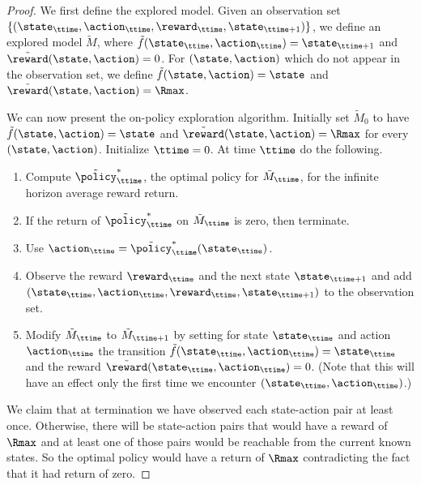 \begin{proof}
We first define the explored model. Given an observation set
$\{(\state_\ttime,\action_\ttime ,\reward_\ttime,
\state_{\ttime+1})\}$, we define an explored model $\tilde{M}$,
where $\tilde{f}(\state_\ttime,\action_\ttime)=\state_{\ttime+1}$
and $\tilde{\reward}(\state,\action)=0$.
%
For $(\state,\action)$ which do not appear in the observation set,
we define $\tilde{f}(\state,\action)=\state$ and
$\tilde{\reward}(\state,\action)=\Rmax$.


We can now present the on-policy exploration algorithm. Initially
set $\tilde{M}_0$ to have $\tilde{f}(\state,\action)=\state$ and
$\tilde{\reward}(\state,\action)=\Rmax$ for every $(\state,\action)$. Initialize $\ttime=0$. At
time $\ttime$ do the following.
\begin{enumerate}
\item
Compute $\tilde{\policy}^*_\ttime$, the optimal policy for
$\tilde{M}_\ttime$, for the infinite horizon average reward return.
\item
If the return of $\tilde{\policy}^*_\ttime$ on $\tilde{M}_\ttime$ is
zero, then terminate.
\item
Use $\action_\ttime=\tilde{\policy}^*_\ttime(\state_{\ttime})$.
\item
Observe the reward $\reward_\ttime$ and the next state
$\state_{\ttime+1}$ and add
$(\state_\ttime,\action_\ttime,\reward_\ttime,\state_{\ttime+1})$ to
the observation set.
\item
Modify $\tilde{M}_\ttime$ to  $\tilde{M}_{\ttime+1}$
by setting for state $\state_\ttime$ and action $\action_\ttime$ the
transition $\tilde{f}(\state_\ttime,\action_\ttime)=\state_\ttime$
and the reward $\tilde{\reward}(\state_\ttime,\action_\ttime)=0$.
(Note that this will have an effect only the first time we encounter
$(\state_\ttime,\action_\ttime)$.)
\end{enumerate}

We claim that at termination we have observed each state-action pair
at least once. Otherwise, there will be state-action pairs that
would have a reward of $\Rmax$ and at least one of those pairs would
be reachable from the current known states. So the optimal policy
would have a return of $\Rmax$ contradicting the fact that it had
return of zero.


\end{proof}
